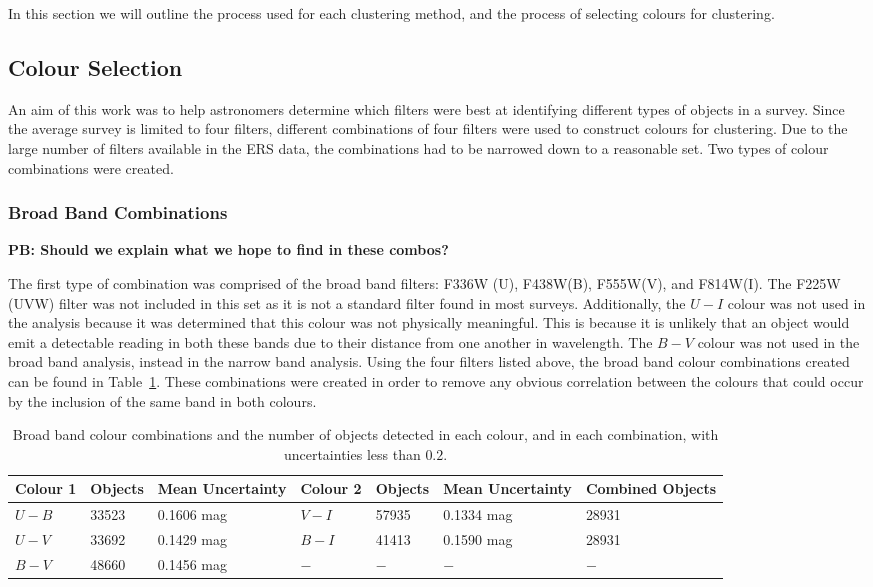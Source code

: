 In this section we will outline the process used for each clustering method, and the process of selecting colours for clustering.

\subsection{Colour Selection}

An aim of this work was to help astronomers determine which filters were best at identifying different types of objects in a survey. 
Since the average survey is limited to four filters, different combinations of four filters were used to construct colours for clustering. 
Due to the large number of filters available in the ERS data, the combinations had to be narrowed down to a reasonable set.
Two types of colour combinations were created.

\subsubsection{Broad Band Combinations}

\textbf{PB: Should we explain what we hope to find in these combos?}

The first type of combination was comprised of the broad band filters: F336W (U), F438W(B), F555W(V), and F814W(I).
The F225W (UVW) filter was not included in this set as it is not a standard filter found in most surveys.
Additionally, the $U - I$ colour was not used in the analysis because it was determined that this colour was not physically meaningful.
This is because it is unlikely that an object would emit a detectable reading in both these bands due to their distance from one another in wavelength.
The $B - V$ colour was not used in the broad band analysis, instead in the narrow band analysis.
Using the four filters listed above, the broad band colour combinations created can be found in Table~\ref{tab:BBcolours}.
These combinations were created in order to remove any obvious correlation between the colours that could occur by the inclusion of the same band in both colours.

\begin{table}
\centering
\caption{Broad band colour combinations and the number of objects detected in each colour, and in each combination, with uncertainties less than $0.2$.}
\label{tab:BBcolours}
\begin{tabular}{lllllll}
\hline\hline
Colour 1 & Objects & Mean Uncertainty & Colour 2 & Objects & Mean Uncertainty & Combined Objects \\
\hline
$U - B$ &  33523 & 0.1606 mag & $V - I$ &  57935 & 0.1334 mag & 28931\\
$U - V$ &  33692 & 0.1429 mag & $B - I$ &  41413 & 0.1590 mag & 28931\\
$B - V$ &  48660 & 0.1456 mag & $ - $ & $ - $ & $ - $ & $ - $ \\
\hline
\end{tabular}
\end{table}

